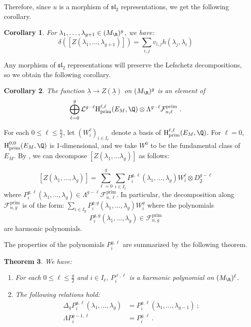 \documentclass[11pt,letterpaper,english]{amsart}
\numberwithin{equation}{subsection}
\numberwithin{equation}{section}
\newcommand\cF{{\mathcal F}}
\newcommand\cL{{\mathcal L}}
\newcommand\fJ{{\mathfrak J}}
\theoremstyle{plain}
\newtheorem{theorem}{Theorem}[section]
\newtheorem{corollary}[theorem]{Corollary}
\theoremstyle{remark}
\begin{document}
Therefore, since $u$ is a morphism of $\mathfrak{sl}_2$ representations, we get the following corollary.
\begin{corollary}\label{c:third-relation} For $\lambda_1,\ldots,\lambda_{g+1}\in (M_\R)^g$, we have: 
    \[\delta([Z(\lambda_1,\ldots,\lambda_{g+1})])=\sum_{i,j}v_{i,j}h(\lambda_j,\lambda_i)\]
\end{corollary}


Any morphism of $\mathfrak{sl}_2$ representations will preserve the Lefschetz decompositions, so we obtain the following corollary.
\begin{corollary}\label{c:lef-decompo}
The function $\underline\lambda\rightarrow Z(\underline\lambda)$ on $(M_\R)^g$ is an element of 
    \[ \bigoplus_{\ell=0}^{g}\cL^{g-\ell} \mathrm{H}^{\ell,\ell}_{\mathrm{prim}}(E_M,\Q)\otimes \Lambda^{g-\ell}\cF_{n,\ell}^{\mathrm{prim}}~.\]
\end{corollary}
\medskip

For each $0\leq \ell\leq \frac{n}{2}$, let $(W^\ell_i)_{i\in I_\ell}$ denote a basis of $\mathrm{H}^{\ell,\ell}_{\mathrm{prim}}(E_M,\Q)$.
For $\ell=0$, $\mathrm{H}^{0,0}_{\mathrm{prim}}(E_M,\Q)$ is 1-dimensional, and we take $W^0$ to be the fundamental class of $E_M$. By , we can decompose $[Z(\lambda_1,\ldots\lambda_g)]$ as follows:

\[[Z(\lambda_1,\ldots,\lambda_g)]=\sum_{\ell=0}^{g}\sum_{i\in I_{\ell}}P^{g,\ell}_i(\lambda_1,\ldots,\lambda_g) W^{\ell}_i\otimes D_\fJ^{g-\ell}\]
where $P_i^{g,\ell}(\lambda_1,\ldots,\lambda_g)\in \Lambda^{g-\ell}\cF_{n,\ell}^{\mathrm{prim}}$. In particular, the decomposition along $\cF^{\mathrm{prim}}_{n,g}$ is of the form: $\sum_{i\in I_g}P_i^{g,g}(\lambda_1,\ldots,\lambda_g)W^g_i$ where the polynomials \[P_i^{g,g}(\lambda_1,\ldots,\lambda_g)\in \cF^{\mathrm{prim}}_{n,g}\] are harmonic polynomials. 



The properties of the polynomials $P_i^{g,\ell}$ are summarized by the following theorem.

\begin{theorem}
    We have:
\begin{enumerate}
    \item For each $0\leq \ell \leq \frac{g}{2}$ and $i\in I_\ell$, $P^{\ell,\ell}_i$ is a harmonic polynomial on $(M_\R)^\ell$.
    \item The following relations hold:
    \begin{align*}
       \Delta_g P_i^{g,\ell} (\lambda_1,\dots,\lambda_g) &= P_i^{g,\ell}(\lambda_1,\dots,\lambda_{g-1}) ~;\\
       \Lambda P_i^{g-1,\ell} &= P_i^{g,\ell}~.
    \end{align*}
\end{enumerate}

\end{theorem}
\end{document}

